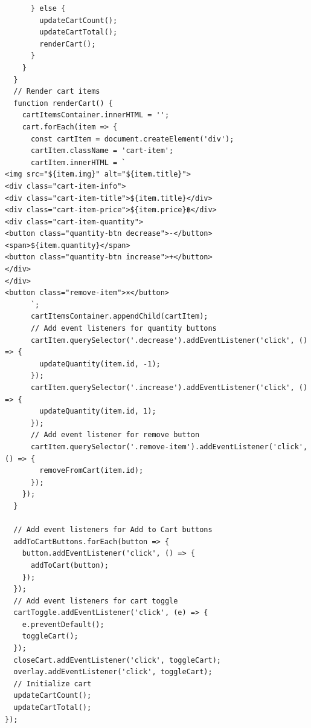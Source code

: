\documentclass{report}
\begin{document}
\begin{verbatim}
      } else {
        updateCartCount();
        updateCartTotal();
        renderCart();
      }
    }
  }
  // Render cart items
  function renderCart() {
    cartItemsContainer.innerHTML = '';
    cart.forEach(item => {
      const cartItem = document.createElement('div');
      cartItem.className = 'cart-item';
      cartItem.innerHTML = `
<img src="${item.img}" alt="${item.title}">
<div class="cart-item-info">
<div class="cart-item-title">${item.title}</div>
<div class="cart-item-price">${item.price}฿</div>
<div class="cart-item-quantity">
<button class="quantity-btn decrease">-</button>
<span>${item.quantity}</span>
<button class="quantity-btn increase">+</button>
</div>
</div>
<button class="remove-item">×</button>
      `;
      cartItemsContainer.appendChild(cartItem);
      // Add event listeners for quantity buttons
      cartItem.querySelector('.decrease').addEventListener('click', () => {
        updateQuantity(item.id, -1);
      });
      cartItem.querySelector('.increase').addEventListener('click', () => {
        updateQuantity(item.id, 1);
      });
      // Add event listener for remove button
      cartItem.querySelector('.remove-item').addEventListener('click', () => {
        removeFromCart(item.id);
      });
    });
  }
 
  // Add event listeners for Add to Cart buttons
  addToCartButtons.forEach(button => {
    button.addEventListener('click', () => {
      addToCart(button);
    });
  });
  // Add event listeners for cart toggle
  cartToggle.addEventListener('click', (e) => {
    e.preventDefault();
    toggleCart();
  });
  closeCart.addEventListener('click', toggleCart);
  overlay.addEventListener('click', toggleCart);
  // Initialize cart
  updateCartCount();
  updateCartTotal();
});
\end{verbatim}
\end{document}
